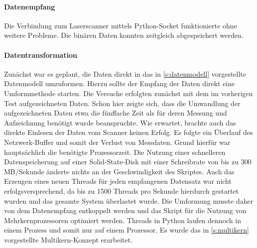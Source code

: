 \documentclass[a4paper,12pt,bibliography=totoc, listof=totoc,titlepage,pointlessnumbers]{scrreprt}
\begin{document}
\paragraph{Datenempfang}
Die Verbindung zum Laserscanner mittels Python-Socket funktionierte ohne weitere Probleme. Die binären Daten konnten zeitgleich abgespeichert werden.

\paragraph{Datentransformation}
Zunächst war es geplant, die Daten direkt in das in \autoref{s:datenmodell} vorgestellte Datenmodell umzuformen. Hierzu sollte der Empfang der Daten direkt eine Umformmethode starten. Die Versuche erfolgten zunächst mit dem im vorherigen Test aufgezeichneten Daten. Schon hier zeigte sich, dass die Umwandlung der aufgezeichneten Daten etwa die fünffache Zeit als für deren Messung und Aufzeichnung benötigt wurde beanspruchte. Wie erwartet, brachte auch das direkte Einlesen der Daten vom Scanner keinen Erfolg. Es folgte ein Überlauf des Netzwerk-Buffer und somit der Verlust von Messdaten. Grund hierfür war hauptsächlich die benötigte Prozessorzeit. Die Nutzung einer schnelleren Datenspeicherung auf einer Solid-State-Disk mit einer Schreibrate von bis zu 300 MB/Sekunde änderte nichts an der Geschwindigkeit des Skriptes. Auch das Erzeugen eines neuen Threads für jeden empfangenen Datensatz war nicht erfolgsversprechend, da bis zu 1500 Threads pro Sekunde hierdurch gestartet wurden und das gesamte System überlastet wurde. Die Umformung musste daher von dem Datenempfang entkoppelt werden und das Skript für die Nutzung von Mehrkernprozessoren optimiert werden. Threads in Python laufen dennoch in einem Prozess und somit nur auf einem Prozessor. Es wurde das in \autoref{s:multikern} vorgestellte Multikern-Konzept erarbeitet.
\end{document}
